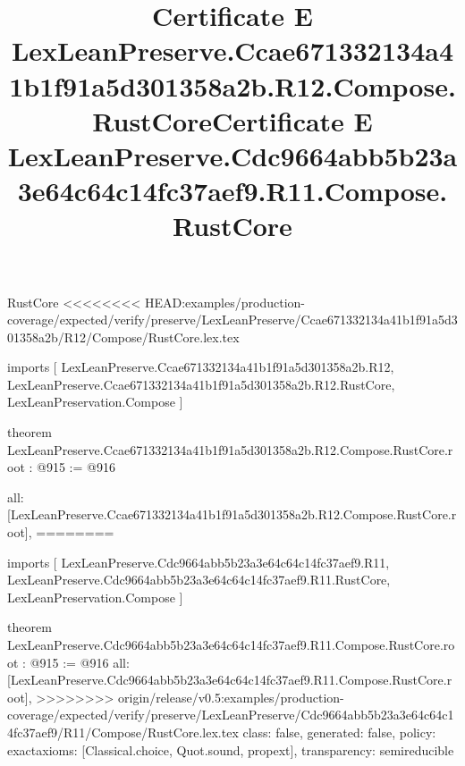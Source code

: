 \begin{lexlean}{RustCore}
<<<<<<<< HEAD:examples/production-coverage/expected/verify/preserve/LexLeanPreserve/Ccae671332134a41b1f91a5d301358a2b/R12/Compose/RustCore.lex.tex
\title{Certificate E LexLeanPreserve.Ccae671332134a41b1f91a5d301358a2b.R12.Compose.RustCore}
\begin{coremodule}
imports [
  LexLeanPreserve.Ccae671332134a41b1f91a5d301358a2b.R12,
  LexLeanPreserve.Ccae671332134a41b1f91a5d301358a2b.R12.RustCore,
  LexLeanPreservation.Compose
]

theorem LexLeanPreserve.Ccae671332134a41b1f91a5d301358a2b.R12.Compose.RustCore.root : @915 := @916 {
  all: [LexLeanPreserve.Ccae671332134a41b1f91a5d301358a2b.R12.Compose.RustCore.root],
========
\title{Certificate E LexLeanPreserve.Cdc9664abb5b23a3e64c64c14fc37aef9.R11.Compose.RustCore}
\begin{coremodule}
imports [
  LexLeanPreserve.Cdc9664abb5b23a3e64c64c14fc37aef9.R11,
  LexLeanPreserve.Cdc9664abb5b23a3e64c64c14fc37aef9.R11.RustCore,
  LexLeanPreservation.Compose
]

theorem LexLeanPreserve.Cdc9664abb5b23a3e64c64c14fc37aef9.R11.Compose.RustCore.root : @915 := @916 {
  all: [LexLeanPreserve.Cdc9664abb5b23a3e64c64c14fc37aef9.R11.Compose.RustCore.root],
>>>>>>>> origin/release/v0.5:examples/production-coverage/expected/verify/preserve/LexLeanPreserve/Cdc9664abb5b23a3e64c64c14fc37aef9/R11/Compose/RustCore.lex.tex
  class: false,
  generated: false,
  policy: exact{axioms: [Classical.choice, Quot.sound, propext]},
  transparency: semireducible
}


\end{coremodule}}
\end{coremodule}
\end{lexlean}
